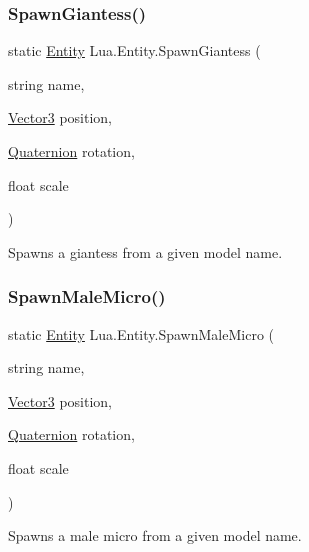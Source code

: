 \subsubsection{\texorpdfstring{SpawnGiantess()}{SpawnGiantess()}}
{\footnotesize\ttfamily static \mbox{\hyperlink{class_lua_1_1_entity}{Entity}} Lua.\+Entity.\+Spawn\+Giantess (\begin{DoxyParamCaption}\item[{string}]{name,  }\item[{\mbox{\hyperlink{class_lua_1_1_vector3}{Vector3}}}]{position,  }\item[{\mbox{\hyperlink{class_lua_1_1_quaternion}{Quaternion}}}]{rotation,  }\item[{float}]{scale }\end{DoxyParamCaption})\hspace{0.3cm}{\ttfamily [static]}}



Spawns a giantess from a given model name. 

\mbox{\label{class_lua_1_1_entity_ad8f4dd9eec83d4df5d28efa120210ef6}} 
\subsubsection{\texorpdfstring{SpawnMaleMicro()}{SpawnMaleMicro()}}
{\footnotesize\ttfamily static \mbox{\hyperlink{class_lua_1_1_entity}{Entity}} Lua.\+Entity.\+Spawn\+Male\+Micro (\begin{DoxyParamCaption}\item[{string}]{name,  }\item[{\mbox{\hyperlink{class_lua_1_1_vector3}{Vector3}}}]{position,  }\item[{\mbox{\hyperlink{class_lua_1_1_quaternion}{Quaternion}}}]{rotation,  }\item[{float}]{scale }\end{DoxyParamCaption})\hspace{0.3cm}{\ttfamily [static]}}



Spawns a male micro from a given model name. 

\mbox{\label{class_lua_1_1_entity_a5bb33d1afcfac1b1452d362cb5d8bb94}} 
